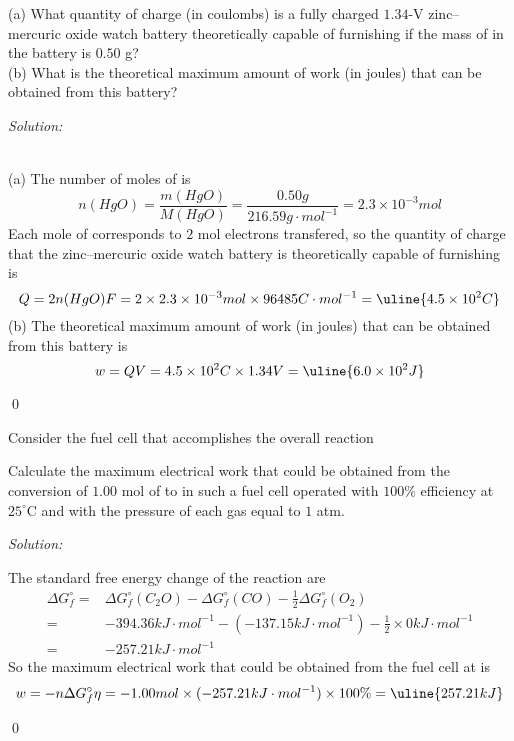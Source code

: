 \documentclass[12pt]{article}
\newenvironment{problem}[2][Problem]{\begin{trivlist}
\item[\hskip \labelsep {\bfseries #1}\hskip \labelsep {\bfseries #2.}]}{\end{trivlist}}
\newenvironment{sol}
    {\emph{Solution:}
    }
    {
    \qed
    }
\begin{document}
\begin{problem}{17.54}
(a) What quantity of charge (in coulombs) is a fully charged $1.34$-V zinc–mercuric oxide watch battery theoretically capable of furnishing if the mass of  in the battery is $0.50$ g?\\
(b) What is the theoretical maximum amount of work (in joules) that can be obtained from this battery?
\end{problem}
\begin{sol}
\\(a) The number of moles of  is
\[
n(HgO)=\frac{m(HgO)}{M(HgO)}=\frac{0.50g}{216.59g\cdot mol^{-1}}=2.3\times10^{-3}mol
\]
Each mole of  corresponds to $2$ mol electrons transfered, so the quantity of charge that the zinc–mercuric oxide watch battery is theoretically capable of furnishing is
\[
Q=2n(HgO)F=2\times2.3\times10^{-3}mol\times96485C\cdot mol^{-1}=\uline{4.5\times10^2C}
\]
(b)  The theoretical maximum amount of work (in joules) that can be obtained from this battery is
\[
w=QV=4.5\times10^2C\times1.34V=\uline{6.0\times10^2J}
\]
\end{sol}

\begin{problem}{17.58}
Consider the fuel cell that accomplishes the overall reaction
\begin{center}
\end{center}
Calculate the maximum electrical work that could be obtained from the conversion of $1.00$ mol of  to  in such a fuel cell operated with $100\%$ efficiency at $25^{\circ}$C and with the pressure of each gas equal to $1$ atm.
\end{problem}
\begin{sol}
The standard free energy change of the reaction are
\begin{align*}
\Delta G_f^{\circ}=&\Delta G_f^{\circ}(C_2O)-\Delta G_f^{\circ}(CO)-\frac{1}{2}\Delta G_f^{\circ}(O_2)\\
=&-394.36kJ\cdot mol^{-1}-(-137.15kJ\cdot mol^{-1})-\frac{1}{2}\times0kJ\cdot mol^{-1}\\
=&-257.21kJ\cdot mol^{-1}
\end{align*}
So the maximum electrical work that could be obtained from the fuel cell at is
\[
w=-n\Delta G_f^{\circ}\eta=-1.00mol\times(-257.21kJ\cdot mol^{-1})\times100\%=\uline{257.21kJ}
\]
\end{sol}
\end{document}
